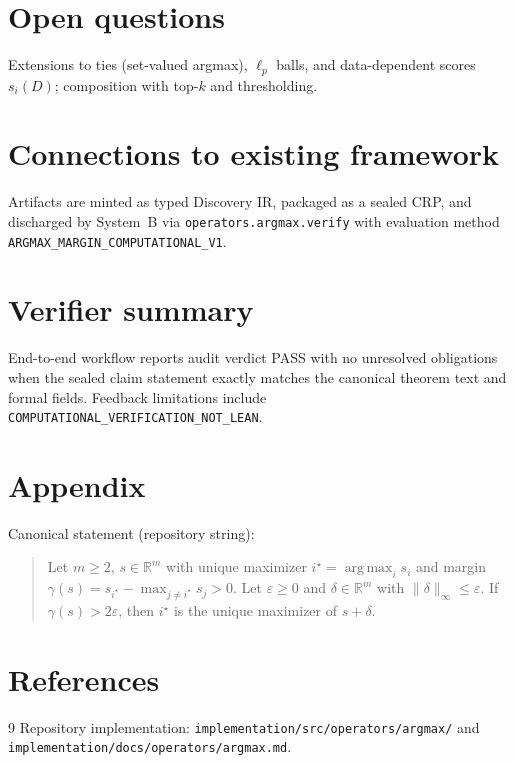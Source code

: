 \documentclass[11pt]{article}
\begin{document}
\section{Open questions}
Extensions to ties (set-valued argmax), \(\ell_p\) balls, and data-dependent
scores \(s_i(D)\); composition with top-\(k\) and thresholding.

\section{Connections to existing framework}
Artifacts are minted as typed Discovery IR, packaged as a sealed CRP, and
discharged by System~B via \texttt{operators.argmax.verify} with evaluation
method \texttt{ARGMAX\_MARGIN\_COMPUTATIONAL\_V1}.

\section{Verifier summary}
End-to-end workflow reports audit verdict PASS with no unresolved obligations
when the sealed claim statement exactly matches the canonical theorem text and
formal fields. Feedback limitations include
\texttt{COMPUTATIONAL\_VERIFICATION\_NOT\_LEAN}.

\section{Appendix}
Canonical statement (repository string):
\begin{quote}\small
Let \(m\ge 2\), \(s\in\mathbb{R}^m\) with unique maximizer
\(i^\star=\operatorname*{arg\,max}_i s_i\) and margin
\(\gamma(s)=s_{i^\star}-\max_{j\neq i^\star}s_j>0\).
Let \(\varepsilon\ge 0\) and \(\delta\in\mathbb{R}^m\) with \(\|\delta\|_\infty\le\varepsilon\).
If \(\gamma(s)>2\varepsilon\), then \(i^\star\) is the unique maximizer of \(s+\delta\).
\end{quote}

\section*{References}
\begin{thebibliography}{9}
Repository implementation:
\texttt{implementation/src/operators/argmax/}
and \texttt{implementation/docs/operators/argmax.md}.
\end{thebibliography}
\end{document}
